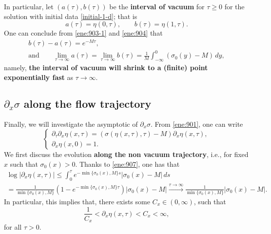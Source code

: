 \documentclass[11pt]{article}
\theoremstyle{plain}
\theoremstyle{definition}
\theoremstyle{remark}
\newcommand{\dx}{\partial_x}
\newcommand{\dtau}{\partial_\tau}
\numberwithin{equation}{section}
\begin{document}
In particular, let $ (a(\tau), b(\tau)) $ be the {\bf interval of vacuum} for $ \tau \geq 0 $ for the solution with initial data \eqref{initial-1-d}; that is
\begin{equation}
    \label{ene:908}
    a(\tau) = \eta(0,\tau), \qquad b(\tau) = \eta(1,\tau).
\end{equation}
One can conclude from \eqref{ene:903-1} and \eqref{ene:904} that
\begin{gather}
    \label{ene:909}
    b(\tau) - a(\tau) = e^{-M\tau}, \\
    \label{ene:910}
    \text{and} \qquad \lim_{\tau \rightarrow \infty} a(\tau) = \lim_{\tau \rightarrow \infty} b(\tau) = \frac{1}{M} \int_{-\infty}^0 (\sigma_0(y) - M )\,dy,
\end{gather}
namely, {\bf the interval of vacuum will shrink to a (finite) point exponentially fast} as $ \tau \rightarrow \infty $. 

\subsection*{$ \dx \sigma $ along the flow trajectory}

Finally, we will investigate the asymptotic of $ \dx\sigma $. From \eqref{ene:901}, one can write 
\begin{equation}
    \label{ene:911}
    \begin{cases}
        \dtau \dx \eta(x,\tau) = (\sigma(\eta(x,\tau),\tau) - M) \dx \eta(x,\tau),\\
        \dx \eta(x,0) = 1.
    \end{cases}
\end{equation}
We first discuss the evolution {\bf along the non vacuum trajectory}, i.e., for fixed $ x $ such that $ \sigma_0(x) > 0 $.
Thanks to \eqref{ene:907}, one has that 
\begin{equation}
    \label{ene:912}
    \begin{gathered}
    \log \vert \dx \eta(x,\tau) \vert \leq \int_0^\tau e^{-\min\lbrace \sigma_0(x),M\rbrace s} \vert \sigma_0(x)-M\vert \,ds \\ =\frac{1}{\min\lbrace \sigma_0(x),M\rbrace}(1-e^{-\min\lbrace \sigma_0(x),M\rbrace \tau})\vert \sigma_0(x) - M \vert 
    \stackrel{\tau \rightarrow \infty}{\rightarrow} \frac{1}{\min\lbrace \sigma_0(x),M\rbrace}\vert \sigma_0(x) - M \vert.
    \end{gathered}
\end{equation}
In particular, this implies that, there exists some $ C_x \in (0,\infty) $, such that
\begin{equation}
    \label{ene:913}
    \frac{1}{C_x} < \dx \eta(x,\tau) < C_x < \infty,
\end{equation}
for all $ \tau > 0 $. 
\end{document}
